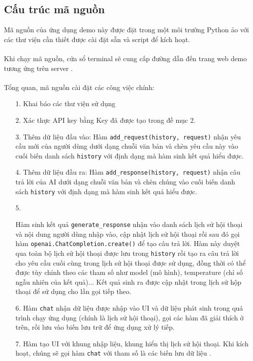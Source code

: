 \documentclass[a4paper, 12pt]{article}
\begin{document}
	
	\subsection{Cấu trúc mã nguồn}
	Mã nguồn của ứng dụng demo này được đặt trong một môi trường Python ảo với các thư viện cần thiết được cài đặt sẵn và script để kích hoạt.
	\\
	\\
	Khi chạy mã nguồn, cửa sổ terminal sẽ cung cấp đường dẫn đến trang web demo tương ứng trên server .
	\\
	\\
	Tổng quan, mã nguồn cài đặt các công việc chính:
	\begin{itemize}
		\item[1.] Khai báo các thư viện sử dụng
		\item[2.] Xác thực API key bằng Key đã được tạo trong đề mục 2.
		
		\item[3.] Thêm dữ liệu đầu vào: Hàm \texttt{add\_request(history, request)} nhận yêu cầu mới của người dùng dưới dạng chuỗi văn bản và chèn yêu cầu này vào cuối biến danh sách \texttt{history} với định dạng mà hàm sinh kết quả hiểu được. 
		\item[4.] Thêm dữ liệu đầu ra: Hàm \texttt{add\_response(history, request)} nhận câu trả lời của AI dưới dạng chuỗi văn bản và  chèn chúng vào cuối biến danh sách \texttt{history} với định dạng mà hàm sinh kết quả  hiểu được. 
		\item[5.] \begin{sloppypar}Hàm sinh kết quả \texttt{generate\_response} nhận vào danh sách lịch sử  hội thoại và nội dung người dùng nhập vào, cập nhật lịch sử hội thoại rồi sau đó gọi hàm \texttt{openai.ChatCompletion.create()} để tạo câu trả lời. Hàm này duyệt qua toàn bộ lịch sử hội thoại được lưu trong \texttt{history} rồi tạo ra câu trả lời cho yêu cầu cuối cùng trong lịch sử hội thoại được sử dụng, đồng thời có thể được tùy chỉnh theo các tham số như model (mô hình), temperature (chỉ số ngẫu nhiên của kết quả)... Kết quả sinh ra được cập nhật trong lịch sử hộp thoại để sử dụng cho lần gọi tiếp theo. \end{sloppypar}
		\item[6.] Hàm \texttt{chat} nhận dữ liệu được nhập vào UI và dữ liệu phát sinh trong quá trình chạy ứng dụng (chính là lịch sử hội thoại), gọi các hàm đã giải thích ở trên, rồi lưu vào biến lưu trữ để ứng dụng xử lý tiếp.
		\item[7.] Hàm tạo UI với khung nhập liệu, khung hiển thị lịch sử hội thoại. Khi kích hoạt, chúng sẽ gọi hàm \texttt{chat} với tham số là các biến lưu dữ liệu .
	\end{itemize}
\end{document}
